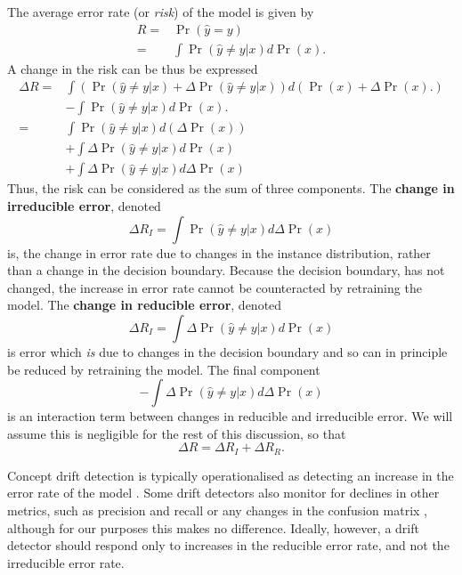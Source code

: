 The average error rate (or {\it risk}) of the model is given by
\begin{align}
    R =& \Pr(\hat{y}=y) \\
    =& \int \Pr(\hat{y}\ne y|x)d\Pr(x).
\end{align}
A change in the risk can be thus be expressed
\begin{align}
	\Delta R =& \int \left( \Pr(\hat{y}\ne y|x) + \Delta \Pr(\hat{y}\ne y|x) \right) d\left( \Pr(x) + \Delta \Pr(x) .\right) \\
	 &- \int \Pr(\hat{y}\ne y|x)d\Pr(x). \\
	=& \int \Pr(\hat{y}\ne y|x) d\left(\Delta \Pr(x)\right) \\
	 &+ \int \Delta \Pr(\hat{y}\ne y|x) d\Pr(x) \\
	 &+ \int \Delta \Pr(\hat{y}\ne y|x) d\Delta \Pr(x)
\end{align}
Thus, the risk can be considered as the sum of three components. The {\bf change in irreducible error}, denoted
\begin{equation}
    \Delta R_I = \int \Pr(\hat{y}\ne y|x) d\Delta \Pr(x)
\end{equation}
is, the change in error rate due to changes in the instance distribution, rather than a change in the decision boundary. Because the decision boundary, has not changed, the increase in error rate cannot be counteracted by retraining the model. The {\bf change in reducible error}, denoted 
\begin{equation}
    \Delta R_I = \int \Delta \Pr(\hat{y}\ne y|x) d\Pr(x) \label{eq:re_err} 
\end{equation}
is error which {\it is} due to changes in the decision boundary and so can in principle be reduced by retraining the model. The final component
\begin{equation}
    - \int \Delta \Pr(\hat{y}\ne y|x) d\Delta \Pr(x)
\end{equation}
is an interaction term between changes in reducible and irreducible error. We will assume this is negligible for the rest of this discussion, so that
\begin{equation}
	\Delta R = \Delta R_I + \Delta R_R.
\end{equation}

Concept drift detection is typically operationalised as detecting an increase in the error rate of the model \cite{gama_survey}. Some drift detectors also monitor for declines in other metrics, such as precision and recall \cite{DDM-OCIa} or any changes in the confusion matrix \cite{LFR}, although for our purposes this makes no difference. Ideally, however, a drift detector should respond only to increases in the reducible error rate, and not the irreducible error rate. 

